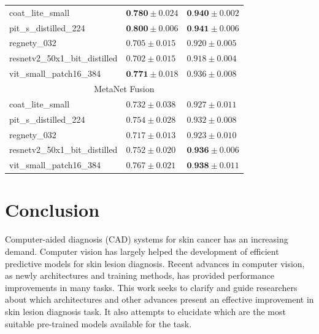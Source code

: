 \documentclass[conference]{IEEEtran}
\begin{document}
\begin{table}
\begin{tabular}{l|l|l}
\hline
coat\_lite\_small                   & $\textbf{0.780} \pm 0.024$ & $\textbf{0.940} \pm 0.002$  \\
pit\_s\_distilled\_224              & $\textbf{0.800} \pm 0.006$ & $\textbf{0.941} \pm 0.006$  \\
regnety\_032                        & $0.705 \pm 0.015$ & $0.920 \pm 0.005$  \\
resnetv2\_50x1\_bit\_distilled      & $0.702 \pm 0.015$ & $0.918 \pm 0.004$  \\
vit\_small\_patch16\_384            & $\textbf{0.771} \pm 0.018$ & $0.936 \pm 0.008$  \\ 
\hline
\multicolumn{3}{c}{MetaNet Fusion}                                                                             \\ 
\hline
coat\_lite\_small                   & $0.732 \pm 0.038$ & $0.927 \pm 0.011$  \\
pit\_s\_distilled\_224              & $0.754 \pm 0.028$ & $0.932 \pm 0.008$  \\
regnety\_032                        & $0.717 \pm 0.013$ & $0.923 \pm 0.010$  \\
resnetv2\_50x1\_bit\_distilled      & $0.752 \pm 0.020$ & $\textbf{0.936} \pm 0.006$  \\
vit\_small\_patch16\_384            & $0.767 \pm 0.021$ & $\textbf{0.938} \pm 0.011$  \\
\bottomrule
\end{tabular}
\end{table}

\section{Conclusion}

Computer-aided diagnosis (CAD) systems for skin cancer has an increasing demand. Computer vision has largely helped the development of efficient predictive models for skin lesion diagnosis. Recent advances in computer vision, as newly architectures and training methods, has provided performance improvements in many tasks. This work seeks to clarify and guide researchers about which architectures and other advances present an effective improvement in skin lesion diagnosis task. It also attempts to elucidate which are the most suitable pre-trained models available for the task. 
\end{document}
